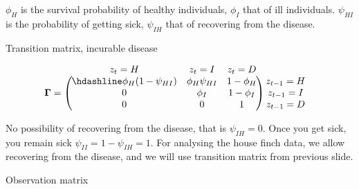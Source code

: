 \documentclass[
  12pt,
]{krantz}
\begin{document}
\(\phi_H\) is the survival probability of healthy individuals, \(\phi_I\) that of ill individuals. \(\psi_{HI}\) is the probability of getting sick, \(\psi_{IH}\) that of recovering from the disease.

Transition matrix, incurable disease

\[
\begin{matrix}
& \\
\mathbf{\Gamma} =
    \left ( \vphantom{ \begin{matrix} 12 \\ 12 \\ 12 \end{matrix} } \right .
\end{matrix}
\hspace{-1.2em}
\begin{matrix}
    z_t=H & z_t=I & z_t=D \\ \hdashline
\phi_H (1-\psi_{HI}) & \phi_H \psi_{HI} & 1 - \phi_H\\
0 & \phi_{I}  & 1 - \phi_{I}\\
0 & 0 & 1
\end{matrix}
\hspace{-0.2em}
\begin{matrix}
& \\
\left . \vphantom{ \begin{matrix} 12 \\ 12 \\ 12 \end{matrix} } \right )
    \begin{matrix}
    z_{t-1}=H \\ z_{t-1}=I \\ z_{t-1}=D
    \end{matrix}
\end{matrix}
\]

No possibility of recovering from the disease, that is \(\psi_{IH} = 0\). Once you get sick, you remain sick \(\psi_{II} = 1 - \psi_{IH} = 1\). For analysing the house finch data, we allow recovering from the disease, and we will use transition matrix from previous slide.

Observation matrix
\end{document}
